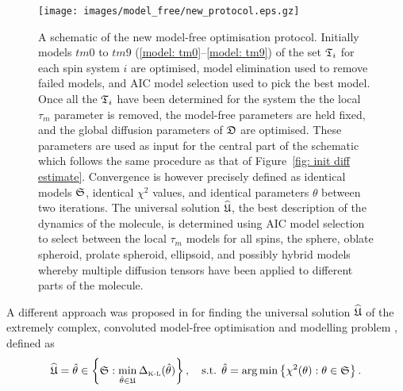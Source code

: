 \begin{htmlonly}
\begin{htmlonly}
\begin{figure}
\centerline{\texttt{[image: images/model\_free/new\_protocol.eps.gz]}}
\caption[A schematic of the new model-free optimisation protocol]{A schematic of the new model-free optimisation protocol.  Initially models $tm0$ to $tm9$ (\ref{model: tm0}--\ref{model: tm9}) of the set $\mathfrak{T}_i$ for each spin system $i$ are optimised, model elimination used to remove failed models, and AIC model selection used to pick the best model.  Once all the $\mathfrak{T}_i$ have been determined for the system the the local $\tau_m$ parameter is removed, the model-free parameters are held fixed, and the global diffusion parameters of $\mathfrak{D}$ are optimised.  These parameters are used as input for the central part of the schematic which follows the same procedure as that of Figure~\ref{fig: init diff estimate}.  Convergence is however precisely defined as identical models $\mathfrak{S}$, identical $\chi^2$ values, and identical parameters $\theta$ between two iterations.  The universal solution $\widehat{\mathfrak{U}}$, the best description of the dynamics of the molecule, is determined using AIC model selection to select between the local $\tau_m$ models for all spins, the sphere, oblate spheroid, prolate spheroid, ellipsoid, and possibly hybrid models whereby multiple diffusion tensors have been applied to different parts of the molecule.} \label{fig: new protocol}
\end{figure}


A different approach was proposed in \citet{dAuvergneGooley08b} for finding the universal solution $\widehat{\mathfrak{U}}$ of the extremely complex, convoluted model-free optimisation and modelling problem \citep{dAuvergneGooley07}, defined as
\begin{equation} \label{eq: universal solution}
 \widehat{\mathfrak{U}} = \hat\theta \in \left\{ \mathfrak{S}: \min_{\hat\theta \in \mathfrak{U}} \Delta_{\scriptscriptstyle \text{K-L}}(\hat\theta) \right\},
  \text{\quad s.t. }
  \hat\theta = \arg \min \left\{\chi^2(\theta): \theta \in \mathfrak{S} \right\}.
\end{equation}


\end{htmlonly}
\end{htmlonly}
